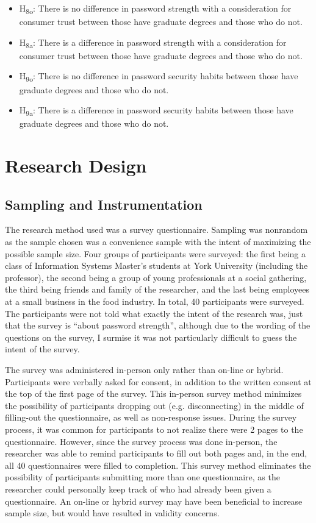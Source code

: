 \documentclass[letterpaper, 10 pt, conference]{ieeeconf}  %
\begin{document}
\begin{itemize}
\item H\textsubscript{8o}: There is no difference in password strength with a consideration for consumer trust between those have graduate degrees and those who do not.
\item H\textsubscript{8a}: There is a difference in password strength with a consideration for consumer trust between those have graduate degrees and those who do not.
\item H\textsubscript{9o}: There is no difference in password security habits between those have graduate degrees and those who do not.
\item H\textsubscript{9a}: There is a difference in password security habits between those have graduate degrees and those who do not.

\end{itemize}


\section{Research Design}

\subsection{Sampling and Instrumentation}

The research method used was a survey questionnaire. Sampling was nonrandom as the sample chosen was a convenience sample with the intent of maximizing the possible sample size. Four groups of participants were surveyed: the first being a class of Information Systems Master’s students at York University (including the professor), the second being a group of young professionals at a social gathering, the third being friends and family of the researcher, and the last being employees at a small business in the food industry. In total, 40 participants were surveyed. The participants were not told what exactly the intent of the research was, just that the survey is “about password strength”, although due to the wording of the questions on the survey, I surmise it was not particularly difficult to guess the intent of the survey.

The survey was administered in-person only rather than on-line or hybrid. Participants were verbally asked for consent, in addition to the written consent at the top of the first page of the survey. This in-person survey method minimizes the possibility of participants dropping out (e.g. disconnecting) in the middle of filling-out the questionnaire, as well as non-response issues. During the survey process, it was common for participants to not realize there were 2 pages to the questionnaire. However, since the survey process was done in-person, the researcher was able to remind participants to fill out both pages and, in the end, all 40 questionnaires were filled to completion. This survey method eliminates the possibility of participants submitting more than one questionnaire, as the researcher could personally keep track of who had already been given a questionnaire. An on-line or hybrid survey may have been beneficial to increase sample size, but would have resulted in validity concerns.
\end{document}
